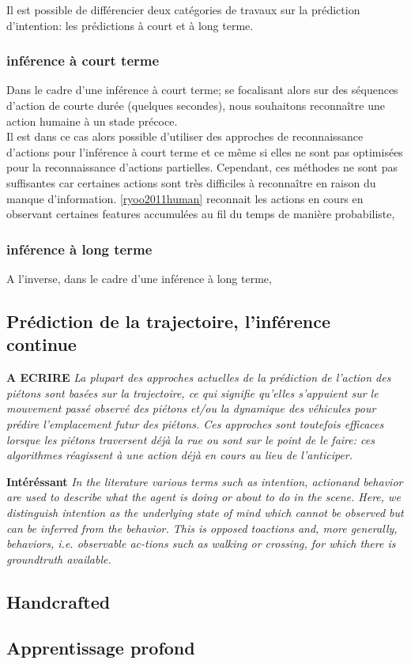 Il est possible de différencier deux catégories de travaux sur la prédiction d'intention: les prédictions à court  et à long terme.

\subsubsection{inférence à court terme}
Dans le cadre d'une inférence à court terme; se focalisant alors sur des séquences d'action de courte durée (quelques secondes), nous souhaitons reconnaître une action humaine à un stade précoce.\\

Il est dans ce cas alors possible d'utiliser des approches de reconnaissance d'actions pour l'inférence à court terme et ce même si elles ne sont pas optimisées pour la reconnaissance d'actions partielles. Cependant, ces méthodes ne sont pas suffisantes car certaines actions sont très difficiles à reconnaître en raison du manque d'information. \ref{ryoo2011human} reconnait les actions en cours en observant certaines features accumulées au fil du temps de manière probabiliste,


\subsubsection{inférence à long terme}
A l'inverse, dans le cadre d'une inférence à long terme,\\


\subsection{Prédiction de la trajectoire, l'inférence continue}



\textbf{A ECRIRE}
\textit{La plupart des approches actuelles de la prédiction de l'action des piétons sont basées sur la trajectoire, ce qui signifie qu'elles s'appuient sur le mouvement passé observé des piétons et/ou la dynamique des véhicules pour prédire l'emplacement futur des piétons. Ces approches sont toutefois efficaces lorsque les piétons traversent déjà la rue ou sont sur le point de le faire: ces algorithmes réagissent à une action déjà en cours au lieu de l'anticiper.}


\textbf{Intéréssant}
\textit{In the literature various terms such as intention, actionand behavior are used to describe what the agent is doing or about to do in the scene. Here, we distinguish intention as the underlying state of mind which cannot be observed but can be inferred from the behavior. This is opposed toactions and, more generally, behaviors, i.e. observable ac-tions such as walking or crossing, for which there is groundtruth available.}




\subsection{Handcrafted}
\subsection{Apprentissage profond}


